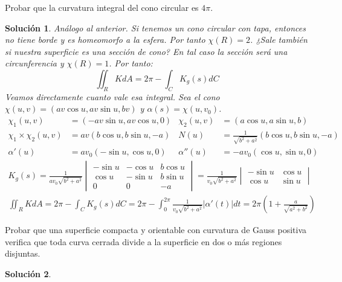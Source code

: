 \documentclass[twoside]{report}
\theoremstyle{plain}
\newtheorem*{sol*}{Solución}
\newcommand{\X}{\chi}
\newenvironment{ejercicio}[2][Estado]{\begin{trivlist}
\item[\hskip \labelsep {\bfseries Ejercicio}\hskip \labelsep {\bfseries #2.}]}{\end{trivlist}}
\begin{document}
\newpage

\begin{ejercicio}{4} Probar que la curvatura integral del cono circular  es $4\pi$. 
\end{ejercicio}
\begin{sol*}
Análogo al anterior. Si tenemos un cono circular con tapa, entonces no tiene borde y es homeomorfo a la esfera. Por tanto $\chi(R)=2$. ¿Sale también si nuestra superficie es una sección de cono? En tal caso la sección será una circunferencia y $\chi(R)=1$. Por tanto:
\[
\iint_R K dA = 2\pi - \int_C K_g(s)dC
\]
Veamos directamente cuanto vale esa integral. Sea el cono $\X(u,v) = (av\cos{u},av\sin{u},bv)$ y $\alpha(s) = \X(u,v_0)$.
\begin{align*}
\X_1(u,v) &= (-av\sin{u},av\cos{u},0)&\X_2(u,v) &=(a\cos{u},a\sin{u},b)\\
\X_1\times\X_2 (u,v)&=av(b\cos{u},b\sin{u},-a) & N(u)&=\frac{1}{\sqrt{b^2+a^2}}(b\cos{u},b\sin{u},-a)\\
\alpha'(u)&=av_0(-\sin{u},\cos{u},0) & \alpha''(u)&=-av_0(\cos{u},\sin{u},0)
\end{align*}
\begin{gather*}
K_g(s) = \frac{1}{av_0 \sqrt{b^2+a^2}}
\begin{vmatrix}
-\sin{u} & -\cos{u} & b\cos{u}\\
\cos{u} & -\sin{u} & b\sin{u}\\
0		&	0		& -a
\end{vmatrix}
= \frac{1}{v_0 \sqrt{b^2+a^2}} 
\begin{vmatrix}
-\sin{u} & \cos{u}\\
\cos{u} & \sin{u}
\end{vmatrix}\\
\iint_R K dA = 2\pi - \int_C K_g(s)dC =2\pi - \int_{0}^{2\pi} \frac{1}{v_0 \sqrt{b^2+a^2}} |\alpha'(t)|dt = 2\pi\left(1+\frac{a}{\sqrt{a^2+b^2}}\right)
\end{gather*}

\end{sol*}
\newpage

\begin{ejercicio}{6} Probar que una superficie compacta y orientable con curvatura de Gauss positiva verifica que toda curva cerrada divide a la superficie en dos o más regiones disjuntas.
\end{ejercicio}
\begin{sol*}

\end{sol*}
\newpage
\end{document}
